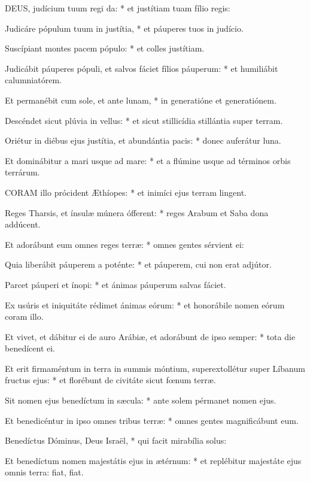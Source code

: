 
\lettrine[lines=2]{D}{EUS}, judícium tuum regi da: * et justítiam tuam fílio regis:

Judicáre pópulum tuum in justítia, * et páuperes tuos in judício.

Suscípiant montes pacem pópulo: * et colles justítiam.

Judicábit páuperes pópuli, et salvos fáciet fílios páuperum: * et humiliábit calumniatórem.

Et permanébit cum sole, et ante lunam, * in generatióne et generatiónem.

Descéndet sicut plúvia in vellus: * et sicut stillicídia stillántia super terram.

Oriétur in diébus ejus justítia, et abundántia pacis: * donec auferátur luna.

Et dominábitur a mari usque ad mare: * et a flúmine usque ad términos orbis terrárum.


\lettrine[lines=2]{C}{ORAM} illo prócident Æthíopes: * et inimíci ejus terram lingent.

Reges Tharsis, et ínsulæ múnera ófferent: * reges Arabum et Saba dona addúcent.

Et adorábunt eum omnes reges terræ: * omnes gentes sérvient ei:

Quia liberábit páuperem a poténte: * et páuperem, cui non erat adjútor.

Parcet páuperi et ínopi: * et ánimas páuperum salvas fáciet.

Ex usúris et iniquitáte rédimet ánimas eórum: * et honorábile nomen eórum coram illo.

Et vivet, et dábitur ei de auro Arábiæ, et adorábunt de ipso semper: * tota die benedícent ei.

Et erit firmaméntum in terra in summis móntium, superextollétur super Líbanum fructus ejus: * et florébunt de civitáte sicut fœnum terræ.

Sit nomen ejus benedíctum in sæcula: * ante solem pérmanet nomen ejus.

Et benedicéntur in ipso omnes tribus terræ: * omnes gentes magnificábunt eum.

Benedíctus Dóminus, Deus Israël, * qui facit mirabília solus:

Et benedíctum nomen majestátis ejus in ætérnum: * et replébitur majestáte ejus omnis terra: fiat, fiat.



